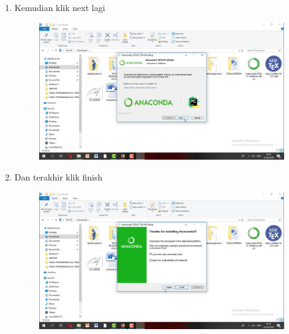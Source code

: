 \begin{enumerate}
\begin{figure}[h]
    \caption{}
    \label{fig:my_label}
\end{figure}
\item  Kemudian klik next lagi
\begin{figure}[h]
    \centering
    \includegraphics[scale=0.2]{gambar/9.png}
    \caption{}
    \label{fig:my_label}
\end{figure}
\item  Dan terakhir klik finish
\begin{figure}[h]
    \centering
    \includegraphics[scale=0.2]{gambar/10.png}
    \caption{}
    \label{fig:my_label}
\end{figure}

\end{enumerate}

